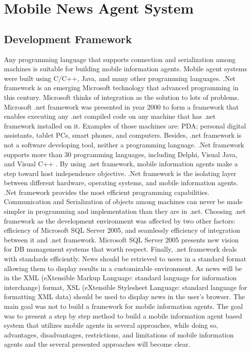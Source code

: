 \documentclass[12pt,a4paper,final,twoside,onecolumn,titlepage]{book}
\begin{document}
\section{Mobile News Agent System}

\subsection{Development Framework}
Any programming language that supports connection and serialization among machines is suitable for building mobile information agents. Mobile agent systems were built using C/C++, Java, and many other programming languages. .Net framework is an emerging Microsoft technology that advanced programming in this century. Microsoft thinks of integration as the solution to lots of problems. Microsoft .net framework was presented in year 2000 to form a framework that enables executing any .net compiled code on any machine that has .net framework installed on it. Examples of those machines are: PDA; personal digital assistants, tablet PCs, smart phones, and computers. Besides, .net framework is not a software developing tool, neither a programming language. .Net framework supports more than 30 programming languages, including Delphi, Visual Java, and Visual C++ \cite{MNAS15}. By using .net framework, mobile information agents make a step toward host independence objective. .Net framework is the isolating layer between different hardware, operating systems, and mobile information agents. .Net framework provides the most efficient programming capabilities. Communication and Serialization of objects among machines can never be made simpler in programming and implementation than they are in .net. Choosing .net framework as the development environment was affected by two other factors: efficiency of Microsoft SQL Server 2005, and seamlessly efficiency of integration between it and .net framework. Microsoft SQL Server 2005 presents new vision for \gls{DB} management systems that worth respect. Finally, .net framework deals with standards efficiently. News should be retrieved to users in a standard format allowing them to display results in a customizable environment. As news will be in the \gls{XML} (eXtensible Markup Language: standard language for information interchange) format, XSL (eXtensible Stylesheet Language: standard language for formatting \gls{XML} data) should be used to display news in the user's browser.
The main goal was not to build a framework for mobile information agents. The goal was to present a step by step method to build a mobile information agent based system that utilizes mobile agents in several approaches, while doing so, advantages, disadvantages, restrictions, and limitations of mobile information agents and the several presented approaches will become clear.
\end{document}
